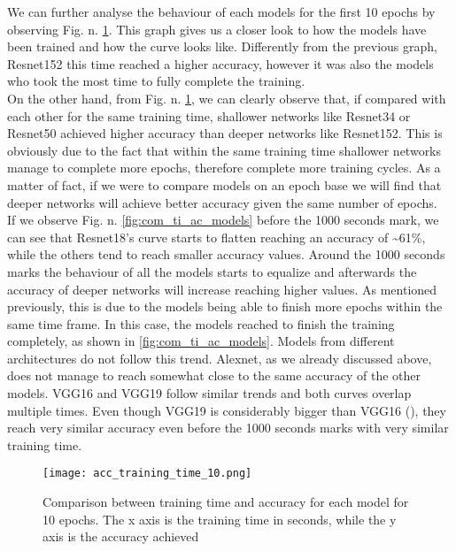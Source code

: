We can further analyse the behaviour of each models for the first 10 epochs by observing Fig. n. \ref{fig:acc_training_10}. This graph gives us a closer look to how the models have been trained and how the curve looks like. Differently from the previous graph, Resnet152 this time reached a higher accuracy, however it was also the models who took the most time to fully complete the training.\\
On the other hand, from Fig. n. \ref{fig:acc_training_10}, we can clearly observe  that, if compared with each other for the same training time, shallower networks like Resnet34 or Resnet50 achieved higher accuracy than deeper networks like Resnet152. This is obviously due to the fact that within the same training time shallower networks manage to complete more epochs, therefore complete more training cycles. As a matter of fact, if we were to compare models on an epoch base we will find that deeper networks will achieve better accuracy given the same number of epochs. \\
If we observe Fig. n. \ref{fig:com_ti_ac_models} before the 1000 seconds mark, we can see that Resnet18's curve starts to flatten reaching an accuracy of \textasciitilde 61\%, while the others tend to reach smaller accuracy values. Around the 1000 seconds marks the behaviour of all the models starts to equalize and afterwards the accuracy of deeper networks will increase reaching higher values. As mentioned previously, this is due to the models being able to finish more epochs within the same time frame. In this case, the models reached to finish the training completely, as shown in \ref{fig:com_ti_ac_models}. 
Models from different architectures do not follow this trend. Alexnet, as we already discussed above, does not manage to reach somewhat close to the same accuracy of the other models. VGG16 and VGG19 follow similar trends and both curves overlap multiple times.  Even though VGG19 is considerably bigger than VGG16 (\cite{simonyan2015deep}), they reach very similar accuracy even before the 1000 seconds marks with very similar training time. \\
\begin{figure}[h]
       \centering 
	    \texttt{[image: acc\_training\_time\_10.png]}
        \caption[Comparison between training time and accuracy for each model for 10 epochs]{Comparison between training time and accuracy for each model for 10 epochs. The x axis is the training time in seconds, while the y axis is the accuracy achieved}
         \label{fig:acc_training_10}
\end{figure}



